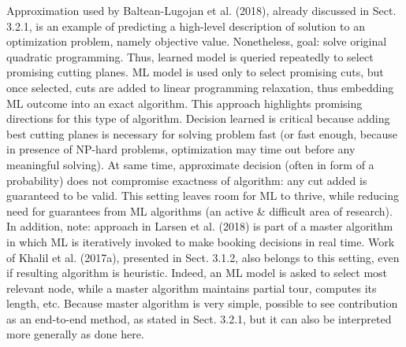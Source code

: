 \documentclass{article}
\begin{document}
\begin{itemize}
\begin{itemize}
\begin{itemize}
            Approximation used by Baltean-Lugojan et al. (2018), already discussed in Sect. 3.2.1, is an example of predicting a high-level description of solution to an optimization problem, namely objective value. Nonetheless, goal: solve original quadratic programming. Thus, learned model is queried repeatedly to select promising cutting planes. ML model is used only to select promising cuts, but once selected, cuts are added to linear programming relaxation, thus embedding ML outcome into an exact algorithm. This approach highlights promising directions for this type of algorithm. Decision learned is critical because adding best cutting planes is necessary for solving problem fast (or fast enough, because in presence of NP-hard problems, optimization may time out before any meaningful solving). At same time, approximate decision (often in form of a probability) does not compromise exactness of algorithm: any cut added is guaranteed to be valid. This setting leaves room for ML to thrive, while reducing need for guarantees from ML algorithms (an active \& difficult area of research). In addition, note: approach in Larsen et al. (2018) is part of a master algorithm in which ML is iteratively invoked to make booking decisions in real time. Work of Khalil et al. (2017a), presented in Sect. 3.1.2, also belongs to this setting, even if resulting algorithm is heuristic. Indeed, an ML model is asked to select most relevant node, while a master algorithm maintains partial tour, computes its length, etc. Because master algorithm is very simple, possible to see contribution as an end-to-end method, as stated in Sect. 3.2.1, but it can also be interpreted more generally as done here.


\end{itemize}
\end{itemize}
\end{itemize}
\end{document}
